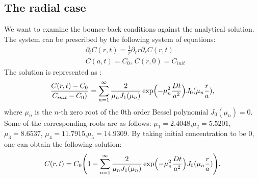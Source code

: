 \documentclass{article}
\newcommand{\beq}{\begin{equation}}
\newcommand{\feq}{\end{equation}}
\begin{document}
\subsection{The radial case}
We want to examine the bounce-back conditions against the analytical solution. The system can be
prescribed by the following system of equations:
\beq
\begin{aligned}
&\partial_t C(r,t)=\frac{1}{r}\partial_r r \partial_r C(r,t)\\
&C(a,t)=C_0,\,C(r,0)=C_{init}
\end{aligned}
\feq 
The solution is represented as \cite{chemical-correlations}:
\beq
\frac{C(r,t)-C_{0}}{C_{init}-C_{0})}=\sum_{n=1}^{\infty}{\frac{2}{\mu_n
J_1(\mu_n)}\exp\Bigl(-\mu_n^2 \frac{D t}{a^2} \Bigr)J_0(\mu_n \frac{r}{a})},
\feq
where $\mu_n$ is the $n$-th zero root of the $0$th order Bessel polynomial $J_0(\mu_n)=0$. Some of
the corresponding roots are as follows: $\mu_1=2.4048$,$\mu_2=5.5201$,$\mu_3=8.6537$,
$\mu_4=11.7915$,$\mu_5=14.9309$.
By taking initial concentration to be $0$, one can obtain the following solution:
\beq
C(r,t)=C_0 \Biggl(1 - \sum_{n=1}^{\infty}{\frac{2}{\mu_n
J_1(\mu_n)}\exp\Bigl(-\mu_n^2 \frac{D t}{a^2} \Bigr)J_0(\mu_n \frac{r}{a})}\Biggr).
\feq
\end{document}
